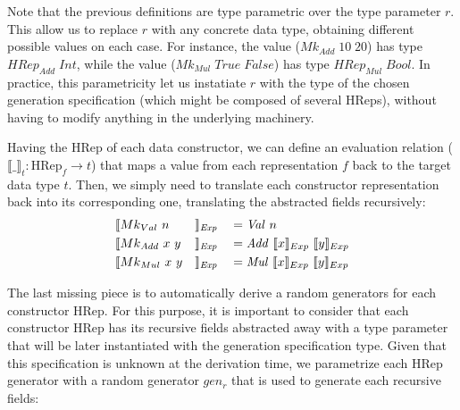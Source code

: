 \documentclass[conference, fleqn]{IEEEtran}
\newcommand{\Conid}[1]{\mathit{#1}}
\newcommand{\Varid}[1]{\mathit{#1}}
\newcommand{\evalrep}[2]{\ensuremath{\llbracket #1 \rrbracket_{#2}}}
\begin{document}
Note that the previous definitions are type parametric over the type parameter
\ensuremath{\Varid{r}}.
%
This allow us to replace \ensuremath{\Varid{r}} with any concrete data type, obtaining different
possible values on each case.
%
For instance, the value (\ensuremath{{Mk}_{Add}\;\mathrm{10}\;\mathrm{20}}) has type \ensuremath{{H\!Rep}_{Add}\;\Conid{Int}}, while the
value (\ensuremath{{Mk}_{Mul}\;\Conid{True}\;\Conid{False}}) has type \ensuremath{{H\!Rep}_{Mul}\;\Conid{Bool}}.
%
In practice, this parametricity let us instatiate \ensuremath{\Varid{r}} with the type of the
chosen generation specification (which might be composed of several \ensuremath{\text{HRep}}s),
without having to modify anything in the underlying machinery.


Having the \ensuremath{\text{HRep}} of each data constructor, we can define an evaluation relation
($\evalrep{\_}{t} : \ensuremath{\text{HRep}}_f \rightarrow t$) that maps a value from each
representation \ensuremath{\Varid{f}} back to the target data type \ensuremath{\Varid{t}}.
%
Then, we simply need to translate each constructor representation back into its
corresponding one, translating the abstracted fields recursively:
%
\begin{alignat*}{4}
  &\evalrep{\ensuremath{{Mk}_{Val}}\ n\ \ \ &&}{\ensuremath{\Conid{Exp}}}
    &&= \ensuremath{\Conid{Val}}\ n \\
  &\evalrep{\ensuremath{{Mk}_{Add}}\ x\ y   &&}{\ensuremath{\Conid{Exp}}}
    &&= \ensuremath{\Conid{Add}}\ \evalrep{x}{Exp}\ \evalrep{y}{Exp} \\
  &\evalrep{\ensuremath{{Mk}_{Mul}}\ x\ y   &&}{\ensuremath{\Conid{Exp}}}
    &&= \ensuremath{\Conid{Mul}}\ \evalrep{x}{Exp}\ \evalrep{y}{Exp}
\end{alignat*}

The last missing piece is to automatically derive a random generators for each
constructor \ensuremath{\text{HRep}}.
%
For this purpose, it is important to consider that each constructor \ensuremath{\text{HRep}} has
its recursive fields abstracted away with a type parameter that will be later
instantiated with the generation specification type.
%
Given that this specification is unknown at the derivation time, we parametrize
each \ensuremath{\text{HRep}} generator with a random generator \ensuremath{gen_{r}} that is used to generate
each recursive fields:
\end{document}
